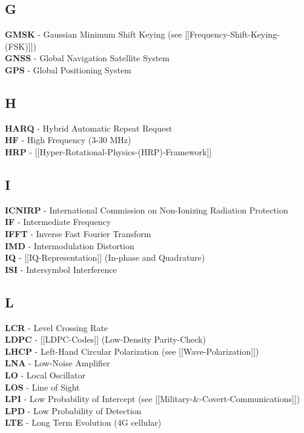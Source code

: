 \subsection{G}\label{g}

\textbf{GMSK} - Gaussian Minimum Shift Keying (see
{[}{[}Frequency-Shift-Keying-(FSK){]}{]})\\
\textbf{GNSS} - Global Navigation Satellite System\\
\textbf{GPS} - Global Positioning System

\subsection{H}\label{h}

\textbf{HARQ} - Hybrid Automatic Repeat Request\\
\textbf{HF} - High Frequency (3-30 MHz)\\
\textbf{HRP} - {[}{[}Hyper-Rotational-Physics-(HRP)-Framework{]}{]}

\subsection{I}\label{i}

\textbf{ICNIRP} - International Commission on Non-Ionizing Radiation
Protection\\
\textbf{IF} - Intermediate Frequency\\
\textbf{IFFT} - Inverse Fast Fourier Transform\\
\textbf{IMD} - Intermodulation Distortion\\
\textbf{IQ} - {[}{[}IQ-Representation{]}{]} (In-phase and Quadrature)\\
\textbf{ISI} - Intersymbol Interference

\subsection{L}\label{l}

\textbf{LCR} - Level Crossing Rate\\
\textbf{LDPC} - {[}{[}LDPC-Codes{]}{]} (Low-Density Parity-Check)\\
\textbf{LHCP} - Left-Hand Circular Polarization (see
{[}{[}Wave-Polarization{]}{]})\\
\textbf{LNA} - Low-Noise Amplifier\\
\textbf{LO} - Local Oscillator\\
\textbf{LOS} - Line of Sight\\
\textbf{LPI} - Low Probability of Intercept (see
{[}{[}Military-\&-Covert-Communications{]}{]})\\
\textbf{LPD} - Low Probability of Detection\\
\textbf{LTE} - Long Term Evolution (4G cellular)


